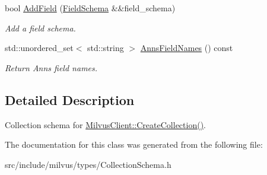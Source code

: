\begin{DoxyCompactItemize}
\mbox{\label{classmilvus_1_1_collection_schema_a7b4cc07641fa507a8f64e8f2cbf18e33}} 
bool \hyperlink{classmilvus_1_1_collection_schema_a7b4cc07641fa507a8f64e8f2cbf18e33}{Add\+Field} (\hyperlink{classmilvus_1_1_field_schema}{Field\+Schema} \&\&field\+\_\+schema)
\begin{DoxyCompactList}\small\item\em Add a field schema. \end{DoxyCompactList}\item 
\mbox{\label{classmilvus_1_1_collection_schema_abfaa9580cb5fb4253cf6723dde06592c}} 
std\+::unordered\+\_\+set$<$ std\+::string $>$ \hyperlink{classmilvus_1_1_collection_schema_abfaa9580cb5fb4253cf6723dde06592c}{Anns\+Field\+Names} () const
\begin{DoxyCompactList}\small\item\em Return Anns field names. \end{DoxyCompactList}\end{DoxyCompactItemize}


\subsection{Detailed Description}
Collection schema for \hyperlink{classmilvus_1_1_milvus_client_a437b0a97bd9f7789504fdfeab885b5dd}{Milvus\+Client\+::\+Create\+Collection()}. 

The documentation for this class was generated from the following file\+:\begin{DoxyCompactItemize}
\item 
src/include/milvus/types/Collection\+Schema.\+h\end{DoxyCompactItemize}
